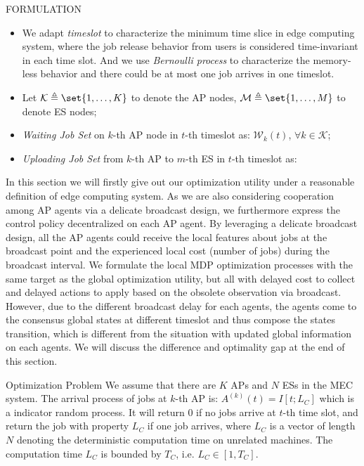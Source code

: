 \documentclass[10pt, conference, letterpaper]{IEEEtran}
\DeclarePairedDelimiter\set\{\}
\newcommand{\apSet}{\mathcal{K}}
\newcommand{\wSet}{\mathcal{W}}
\begin{document}
    \begin{section}{FORMULATION}
        \label{sec:formulation}
        \begin{itemize}
            \item We adapt \emph{timeslot} to characterize the minimum time slice in edge computing system, where the job release behavior from users is considered time-invariant in each time slot. And we use \emph{Bernoulli process} to characterize the memory-less behavior and there could be at most one job arrives in one timeslot.
            
            \item Let $\mathcal{K} \triangleq \set{1,\dots,K}$ to denote the AP nodes, $\mathcal{M} \triangleq \set{1,\dots,M}$ to denote ES nodes;
            
            \item \emph{Waiting Job Set} on $k$-th AP node in $t$-th timeslot as: $\wSet_{k}(t)$, $\forall k \in \apSet$;
            
            \item \emph{Uploading Job Set} from $k$-th AP to $m$-th ES in $t$-th timeslot as:
        \end{itemize}

        In this section we will firstly give out our optimization utility under a reasonable definition of edge computing system. As we are also considering cooperation among AP agents via a delicate broadcast design, we furthermore express the control policy decentralized on each AP agent.
        By leveraging a delicate broadcast design, all the AP agents could receive the local features about jobs at the broadcast point and the experienced local cost (number of jobs) during the broadcast interval.
        We formulate the local MDP optimization processes with the same target as the global optimization utility, but all with delayed cost to collect and delayed actions to apply based on the obsolete observation via broadcast. However, due to the different broadcast delay for each agents, the agents come to the consensus global states at different timeslot and thus compose the states transition, which is different from the situation with updated global information on each agents. We will discuss the difference and optimality gap at the end of this section.

        \begin{subsection}{Optimization Problem}
            We assume that there are $K$ APs and $N$ ESs in the MEC system.
            The arrival process of jobs at $k$-th AP is: $A^{(k)}(t)=I[t; L_C]$ which is a indicator random process. It will return $0$ if no jobs arrive at $t$-th time slot, and return the job with property $L_C$ if one job arrives, where $L_C$ is a vector of length $N$ denoting the deterministic computation time on unrelated machines.
            The computation time $L_C$ is bounded by $T_C$, i.e. $L_C \in [1,T_C]$.
                

\end{subsection}
\end{section}
\end{document}
